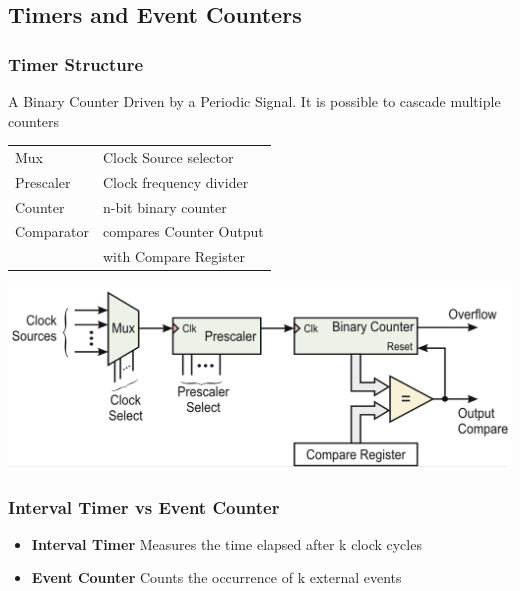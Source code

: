 \subsection{Timers and Event Counters }
\subsubsection{Timer Structure}
A Binary Counter Driven by a Periodic Signal. It is possible to cascade multiple counters\\
\vspace{1cm}
\begin{minipage}{0.5\linewidth}
	\begin{tabular}{ll}
		Mux           & Clock Source selector \\
		Prescaler     & Clock frequency divider \\
		Counter       & n-bit binary counter \\
		Comparator    & compares Counter Output\\
                      &  with Compare Register
	\end{tabular}
\end{minipage}
\begin{minipage}{0.5\linewidth}
	\includegraphics[width=\linewidth]{images/timerstructure.png} 
\end{minipage}
\vspace{-1.5cm}
\subsubsection{Interval Timer vs Event Counter}
	\begin{itemize}
		\item \textbf{Interval Timer}
		\subitem Measures the time elapsed after k clock cycles
		\item \textbf{Event Counter}
		\subitem Counts the occurrence of k external events
	\end{itemize}

